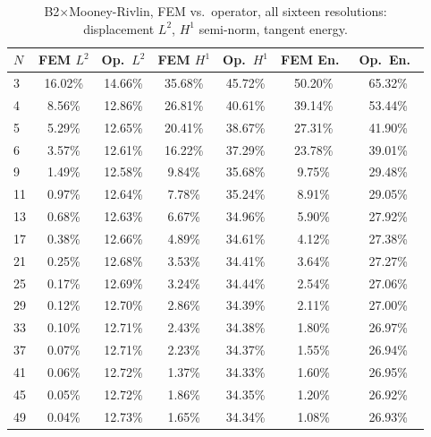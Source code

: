 \documentclass[final,5p,times]{elsarticle}
\begin{document}
\begin{table}[ht]
\centering
\caption{B2$\times$Mooney-Rivlin, FEM vs.\ operator, all sixteen
  resolutions: displacement $L^2$, $H^1$ semi-norm, tangent energy.}
\label{tab:b1-b2mr-a}
\scriptsize
\begin{tabular}{lcccccc}
\toprule
$N$ & FEM $L^2$ & Op.\ $L^2$ & FEM $H^1$ & Op.\ $H^1$ & FEM En.\ & Op.\ En.\ \\
\midrule
3  & 16.02\% & 14.66\% & 35.68\% & 45.72\% & 50.20\% & 65.32\% \\
4  & 8.56\%  & 12.86\% & 26.81\% & 40.61\% & 39.14\% & 53.44\% \\
5  & 5.29\%  & 12.65\% & 20.41\% & 38.67\% & 27.31\% & 41.90\% \\
6  & 3.57\%  & 12.61\% & 16.22\% & 37.29\% & 23.78\% & 39.01\% \\
9  & 1.49\%  & 12.58\% & 9.84\%  & 35.68\% & 9.75\%  & 29.48\% \\
11 & 0.97\%  & 12.64\% & 7.78\%  & 35.24\% & 8.91\%  & 29.05\% \\
13 & 0.68\%  & 12.63\% & 6.67\%  & 34.96\% & 5.90\%  & 27.92\% \\
17 & 0.38\%  & 12.66\% & 4.89\%  & 34.61\% & 4.12\%  & 27.38\% \\
21 & 0.25\%  & 12.68\% & 3.53\%  & 34.41\% & 3.64\%  & 27.27\% \\
25 & 0.17\%  & 12.69\% & 3.24\%  & 34.44\% & 2.54\%  & 27.06\% \\
29 & 0.12\%  & 12.70\% & 2.86\%  & 34.39\% & 2.11\%  & 27.00\% \\
33 & 0.10\%  & 12.71\% & 2.43\%  & 34.38\% & 1.80\%  & 26.97\% \\
37 & 0.07\%  & 12.71\% & 2.23\%  & 34.37\% & 1.55\%  & 26.94\% \\
41 & 0.06\%  & 12.72\% & 1.37\%  & 34.33\% & 1.60\%  & 26.95\% \\
45 & 0.05\%  & 12.72\% & 1.86\%  & 34.35\% & 1.20\%  & 26.92\% \\
49 & 0.04\%  & 12.73\% & 1.65\%  & 34.34\% & 1.08\%  & 26.93\% \\
\bottomrule
\end{tabular}
\end{table}
\end{document}
